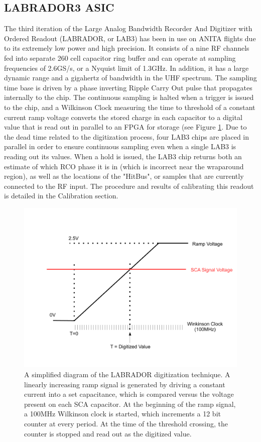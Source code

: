 	\subsection{LABRADOR3 ASIC}
		The third iteration of the Large Analog Bandwidth Recorder And Digitizer with Ordered Readout (LABRADOR, or LAB3) has been in use on ANITA flights due to its extremely low power and high precision.  It consists of a nine RF channels fed into separate 260 cell capacitor ring buffer and can operate at sampling frequencies of 2.6GS/s, or a Nyquist limit of 1.3GHz.  In addition, it has a large dynamic range and a gigahertz of bandwidth in the UHF spectrum.  The sampling time base is driven by a phase inverting Ripple Carry Out pulse that propagates internally to the chip.  The continuous sampling is halted when a trigger is issued to the chip, and a Wilkinson Clock measuring the time to threshold of a constant current ramp voltage converts the stored charge in each capacitor to a digital value that is read out in parallel to an FPGA for storage (see Figure \ref{fig:LAB_Dig}.  Due to the dead time related to the digitization process, four LAB3 chips are placed in parallel in order to ensure continuous sampling even when a single LAB3 is reading out its values.  When a hold is issued, the LAB3 chip returns both an estimate of which RCO phase it is in (which is incorrect near the wraparound region), as well as the locations of the "HitBus", or samples that are currently connected to the RF input. The procedure and results of calibrating this readout is detailed in the Calibration section.
		

\begin{figure}
\centering
	\includegraphics[width=\textwidth]{figures/LAB3_Dig}
	\caption{A simplified diagram of the LABRADOR digitization technique.  A linearly increasing ramp signal is generated by driving a constant current into a set capacitance, which is compared versus the voltage present on each SCA capacitor.  At the beginning of the ramp signal, a 100MHz Wilkinson clock is started, which increments a 12 bit counter at every period.  At the time of the threshold crossing, the counter is stopped and read out as the digitized value.}
	\label{fig:LAB_Dig}
\end{figure}

